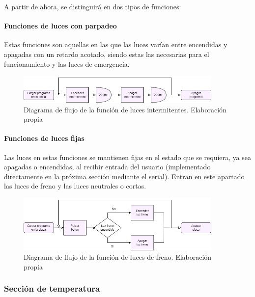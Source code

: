 A partir de ahora, se distinguirá en dos tipos de funciones:

\paragraph*{Funciones de luces con parpadeo}
Estas funciones son aquellas en las que las luces varían entre encendidas y apagadas con un retardo acotado, siendo estas las necesarias para el funcionamiento y las luces de emergencia.

\begin{figure}[H]
    \centering
    \includegraphics[width=0.9\textwidth]{imagenes/diagramas/turn_base.png}
    \caption{Diagrama de flujo de la función de luces intermitentes. Elaboración propia}
\end{figure}


\paragraph*{Funciones de luces fijas}
Las luces en estas funciones se mantienen fijas en el estado que se requiera, ya sea apagadas o encendidas, al recibir entrada del usuario (implementado directamente en la próxima sección mediante el serial). Entran en este apartado las luces de freno y las luces neutrales o cortas. 


\begin{figure}[H]
    \centering
    \includegraphics[width=0.9\textwidth]{imagenes/diagramas/brake_base.png}
    \caption{Diagrama de flujo de la función de luces de freno. Elaboración propia}
\end{figure}







\subsubsection{Sección de temperatura}

